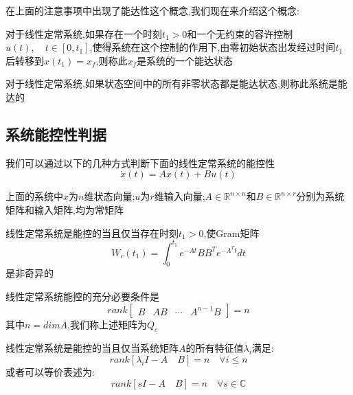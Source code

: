 在上面的注意事项中出现了能达性这个概念,我们现在来介绍这个概念:
\begin{definition}[能达状态]
    对于线性定常系统,如果存在一个时刻$t_1 > 0$和一个无约束的容许控制$u(t),\quad t \in \left[0,t_1\right]$,使得系统在这个控制的作用下,由零初始状态出发经过时间$t_1$后转移到$x(t_1) = x_f$,则称此$x_f$是系统的一个能达状态
\end{definition}

\begin{definition}[系统能达]
    对于线性定常系统,如果状态空间中的所有非零状态都是能达状态,则称此系统是能达的
\end{definition}

\subsection{系统能控性判据}

我们可以通过以下的几种方式判断下面的线性定常系统的能控性
\begin{equation*}
    \dot{x}(t) = A x(t) + B u(t)
\end{equation*}

上面的系统中$x$为$n$维状态向量;$u$为$r$维输入向量;$A \in \mathbb{R}^{n \times n}$和$B \in \mathbb{R}^{n \times r}$分别为系统矩阵和输入矩阵,均为常矩阵

\begin{theorem}
    线性定常系统是能控的当且仅当存在时刻$t_1 > 0$,使Gram矩阵
    \begin{equation*}
        W_c(t_1) = \int_0^{t_1} e^{-At} B B^T e^{-A^T t} dt 
    \end{equation*}
    是非奇异的
\end{theorem}

\begin{theorem}
    线性定常系统能控的充分必要条件是
    \begin{equation*}
        rank\left[\begin{array}{cccc}
            B & AB & \cdots & A^{n-1}B
        \end{array}\right] = n
    \end{equation*}
    其中$n = dim A$,我们称上述矩阵为$Q_c$
\end{theorem}

\begin{theorem}[PBH判据]
    线性定常系统是能控的当且仅当系统矩阵$A$的所有特征值$\lambda_i$满足:
    \begin{equation*}
        rank\left[ \lambda_i I - A \quad B \right] = n \quad \forall i \leq n
    \end{equation*}
    或者可以等价表述为:
    \begin{equation*}
        rank \left[ sI - A \quad B \right] = n \quad \forall s \in \mathbb{C}
    \end{equation*}
\end{theorem}

